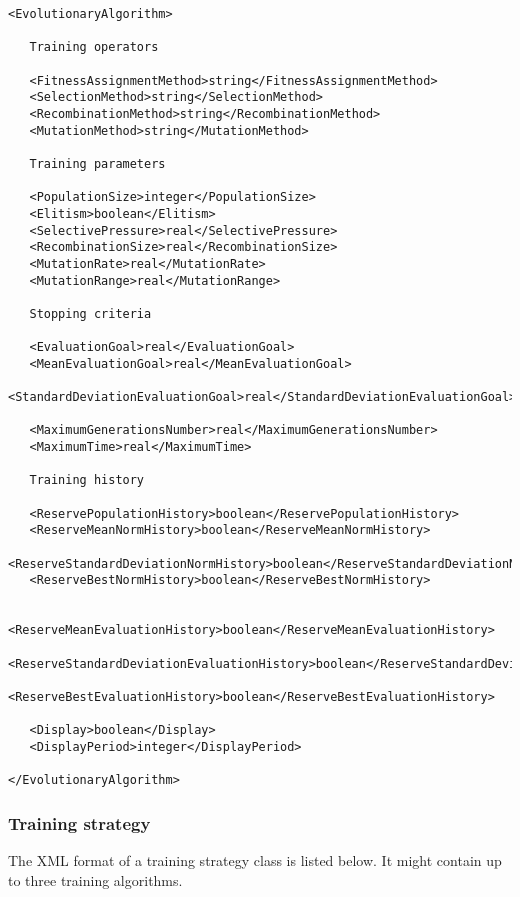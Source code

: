 \begin{lstlisting}
<EvolutionaryAlgorithm>

   Training operators

   <FitnessAssignmentMethod>string</FitnessAssignmentMethod>
   <SelectionMethod>string</SelectionMethod>
   <RecombinationMethod>string</RecombinationMethod>
   <MutationMethod>string</MutationMethod>
      
   Training parameters
   
   <PopulationSize>integer</PopulationSize>
   <Elitism>boolean</Elitism>
   <SelectivePressure>real</SelectivePressure>
   <RecombinationSize>real</RecombinationSize>
   <MutationRate>real</MutationRate>
   <MutationRange>real</MutationRange>
   
   Stopping criteria
   
   <EvaluationGoal>real</EvaluationGoal>
   <MeanEvaluationGoal>real</MeanEvaluationGoal>
   <StandardDeviationEvaluationGoal>real</StandardDeviationEvaluationGoal>
   
   <MaximumGenerationsNumber>real</MaximumGenerationsNumber>
   <MaximumTime>real</MaximumTime>
      
   Training history
   
   <ReservePopulationHistory>boolean</ReservePopulationHistory>
   <ReserveMeanNormHistory>boolean</ReserveMeanNormHistory>
   <ReserveStandardDeviationNormHistory>boolean</ReserveStandardDeviationNormHistory>
   <ReserveBestNormHistory>boolean</ReserveBestNormHistory>
   
   <ReserveMeanEvaluationHistory>boolean</ReserveMeanEvaluationHistory>
   <ReserveStandardDeviationEvaluationHistory>boolean</ReserveStandardDeviationEvaluationHistory>
   <ReserveBestEvaluationHistory>boolean</ReserveBestEvaluationHistory>
      
   <Display>boolean</Display>
   <DisplayPeriod>integer</DisplayPeriod>
   
</EvolutionaryAlgorithm>
\end{lstlisting}


\subsubsection*{Training strategy}

The XML format of a training strategy class is listed below.
It might contain up to three training algorithms. 

